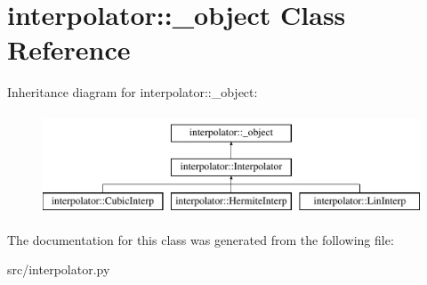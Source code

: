 \hypertarget{classinterpolator_1_1__object}{
\section{interpolator::\_\-object Class Reference}
\label{d9/d1b/classinterpolator_1_1__object}
}
Inheritance diagram for interpolator::\_\-object:\begin{figure}[H]
\begin{center}
\leavevmode
\includegraphics[height=3cm]{d9/d1b/classinterpolator_1_1__object}
\end{center}
\end{figure}


The documentation for this class was generated from the following file:\begin{DoxyCompactItemize}
\item 
src/interpolator.py\end{DoxyCompactItemize}
